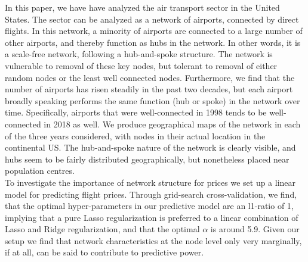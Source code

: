 \label{sec:conclusion}
In this paper, we have have analyzed the air transport sector in the United States. The sector can be analyzed as a network of airports, connected by direct flights. In this network, a minority of airports are connected to a large number of other airports, and thereby function as hubs in the network. In other words, it is a scale-free network, following a hub-and-spoke structure. The network is vulnerable to removal of these key nodes, but tolerant to removal of either random nodes or the least well connected nodes. Furthermore, we find that the number of airports has risen steadily in the past two decades, but each airport broadly speaking performs the same function (hub or spoke) in the network over time. Specifically, airports that were well-connected in 1998 tends to be well-connected in 2018 as well. We produce geographical maps of the network in each of the three years considered, with nodes in their actual location in the continental US. The hub-and-spoke nature of the network is clearly visible, and hubs seem to be fairly distributed geographically, but nonetheless placed near population centres.
\medskip\\
To investigate the importance of network structure for prices we set up a linear model for predicting flight prices. Through grid-search cross-validation, we find, that the optimal hyper-parameters in our predictive model are an l1-ratio of 1, implying that a pure Lasso regularization is preferred to a linear combination of Lasso and Ridge regularization, and that the optimal $\alpha$ is around 5.9.
Given our setup we find that network characteristics at the node level only very marginally, if at all, can be said to contribute to predictive power.